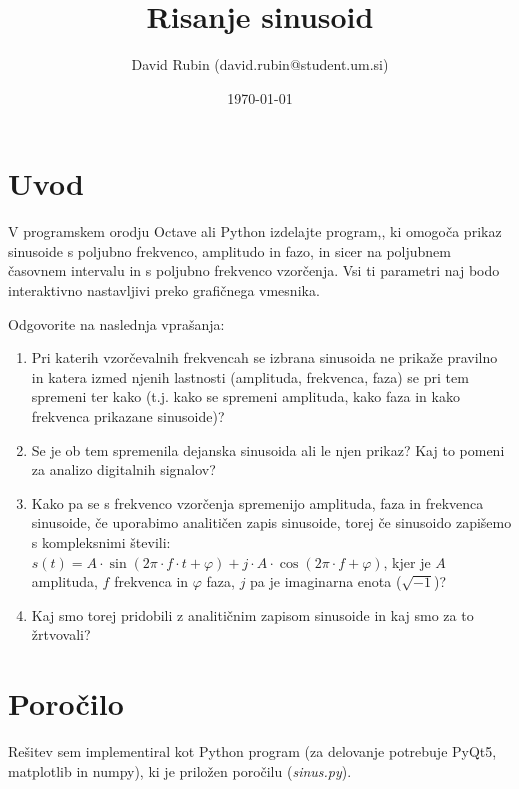 \documentclass[a4paper,11pt]{article}
\title{Risanje sinusoid}
\author{David Rubin (david.rubin@student.um.si)}
\date{\today}
\begin{document}
\maketitle

\section{Uvod}

V programskem orodju  Octave ali Python izdelajte program,, ki omogoča prikaz sinusoide s poljubno frekvenco, amplitudo in fazo, in sicer na poljubnem časovnem intervalu in s poljubno frekvenco vzorčenja. Vsi ti parametri naj bodo interaktivno nastavljivi preko grafičnega vmesnika. 

Odgovorite na naslednja vprašanja:
\begin{enumerate}
	\item Pri katerih vzorčevalnih frekvencah se izbrana sinusoida ne prikaže pravilno in katera izmed njenih lastnosti (amplituda, frekvenca, faza) se pri tem spremeni ter kako (t.j. kako se spremeni amplituda, kako faza in kako frekvenca prikazane sinusoide)?
 	\item Se je ob tem spremenila dejanska sinusoida ali le njen prikaz? Kaj to pomeni za analizo digitalnih signalov?
	\item Kako pa se s frekvenco vzorčenja spremenijo amplituda, faza in frekvenca sinusoide, če uporabimo analitičen zapis sinusoide, torej če sinusoido zapišemo s kompleksnimi števili: $s(t) = A\cdot \sin(2\pi \cdot f \cdot t + \varphi) + j \cdot A \cdot \cos(2 \pi \cdot f + \varphi)$, kjer je $A$ amplituda, $f$ frekvenca in $\varphi$ faza, $j$ pa je imaginarna enota ($\sqrt{-1}$)?
	\item Kaj smo torej pridobili z analitičnim zapisom sinusoide in kaj smo za to žrtvovali?


\end{enumerate}

\section{Poročilo}

Rešitev sem implementiral kot Python program (za delovanje potrebuje PyQt5, matplotlib in numpy), ki je priložen poročilu (\textit{sinus.py}).
\end{document}
